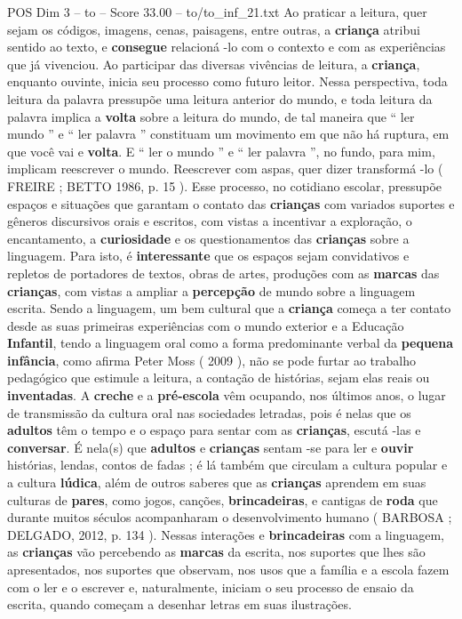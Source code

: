 \begin{textsample}{POS Dim 3 – to – Score 33.00 – to/to\_inf\_21.txt}
Ao praticar a leitura, quer sejam os códigos, imagens, cenas, paisagens, entre outras, a \textbf{criança} atribui sentido ao texto, e \textbf{consegue} relacioná -lo com o contexto e com as experiências que já vivenciou.
Ao participar das diversas vivências de leitura, a \textbf{criança}, enquanto ouvinte, inicia seu processo como futuro leitor.
Nessa perspectiva, toda leitura da palavra pressupõe uma leitura anterior do mundo, e toda leitura da palavra implica a \textbf{volta} sobre a leitura do mundo, de tal maneira que “ ler mundo ” e “ ler palavra ” constituam um movimento em que não há ruptura, em que você vai e \textbf{volta}.
E “ ler o mundo ” e “ ler palavra ”, no fundo, para mim, implicam reescrever o mundo.
Reescrever com aspas, quer dizer transformá -lo ( FREIRE ; BETTO 1986, p. 15 ).
Esse processo, no cotidiano escolar, pressupõe espaços e situações que garantam o contato das \textbf{crianças} com variados suportes e gêneros discursivos orais e escritos, com vistas a incentivar a exploração, o encantamento, a \textbf{curiosidade} e os questionamentos das \textbf{crianças} sobre a linguagem.
Para isto, é \textbf{interessante} que os espaços sejam convidativos e repletos de portadores de textos, obras de artes, produções com as \textbf{marcas} das \textbf{crianças}, com vistas a ampliar a \textbf{percepção} de mundo sobre a linguagem escrita.
Sendo a linguagem, um bem cultural que a \textbf{criança} começa a ter contato desde as suas primeiras experiências com o mundo exterior e a Educação \textbf{Infantil}, tendo a linguagem oral como a forma predominante verbal da \textbf{pequena} \textbf{infância}, como afirma Peter Moss ( 2009 ), não se pode furtar ao trabalho pedagógico que estimule a leitura, a contação de histórias, sejam elas reais ou \textbf{inventadas}.
A \textbf{creche} e a \textbf{pré-escola} vêm ocupando, nos últimos anos, o lugar de transmissão da cultura oral nas sociedades letradas, pois é nelas que os \textbf{adultos} têm o tempo e o espaço para sentar com as \textbf{crianças}, escutá -las e \textbf{conversar}.
É nela(s) que \textbf{adultos} e \textbf{crianças} sentam -se para ler e \textbf{ouvir} histórias, lendas, contos de fadas ; é lá também que circulam a cultura popular e a cultura \textbf{lúdica}, além de outros saberes que as \textbf{crianças} aprendem em suas culturas de \textbf{pares}, como jogos, canções, \textbf{brincadeiras}, e cantigas de \textbf{roda} que durante muitos séculos acompanharam o desenvolvimento humano ( BARBOSA ; DELGADO, 2012, p. 134 ).
Nessas interações e \textbf{brincadeiras} com a linguagem, as \textbf{crianças} vão percebendo as \textbf{marcas} da escrita, nos suportes que lhes são apresentados, nos suportes que observam, nos usos que a família e a escola fazem com o ler e o escrever e, naturalmente, iniciam o seu processo de ensaio da escrita, quando começam a desenhar letras em suas ilustrações.

\end{textsample}

